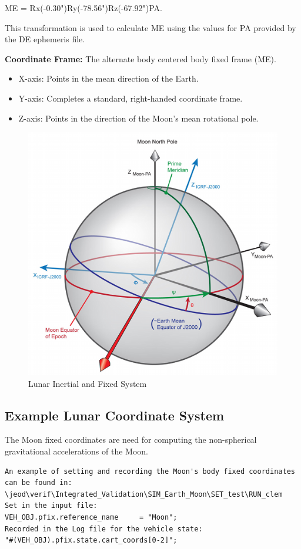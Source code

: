 ME = Rx(-0.30")Ry(-78.56")Rz(-67.92")PA.

This transformation is used to calculate ME using the values for PA provided by the DE ephemeris file.

\textbf{Coordinate Frame: } The alternate body centered body fixed frame (ME).

\begin{itemize}
\item X-axis: Points in the mean direction of the Earth.
\item Y-axis: Completes a standard, right-handed coordinate frame.
\item Z-axis: Points in the direction of the Moon's mean rotational pole.
\end{itemize}

\begin{figure}[htp]
\centering
\includegraphics [width=7in]{figs/fig6.png}
\caption{Lunar Inertial and Fixed System}
\label{fig:6}
\end{figure}

\subsection{Example Lunar Coordinate System}
The Moon fixed coordinates are need for computing the non-spherical gravitational accelerations of the Moon.
\begin{verbatim}
An example of setting and recording the Moon's body fixed coordinates can be found in:
\jeod\verif\Integrated_Validation\SIM_Earth_Moon\SET_test\RUN_clem
Set in the input file:
VEH_OBJ.pfix.reference_name     = "Moon";
Recorded in the Log file for the vehicle state:
"#(VEH_OBJ).pfix.state.cart_coords[0-2]";
\end{verbatim}


